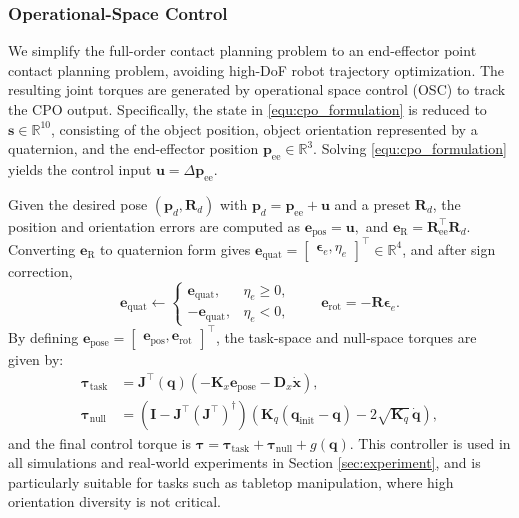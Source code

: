 \subsubsection{Operational-Space Control}
\label{sec:osc_control}
We simplify the full-order contact planning problem to an end-effector point contact planning problem, avoiding high-DoF robot trajectory optimization. The resulting joint torques are generated by operational space control (OSC) \cite{nakanishi2008operational} to track the CPO output. Specifically, the state in \eqref{equ:cpo_formulation} is reduced to $\boldsymbol{s} \in \mathbb{R}^{10}$, consisting of the object position, object orientation represented by a quaternion, and the end-effector position $\boldsymbol{p}_{\text{ee}} \in \mathbb{R}^3$. Solving \eqref{equ:cpo_formulation} yields the control input $\boldsymbol{u} = \Delta \boldsymbol{p}_{\text{ee}}$.

Given the desired pose $(\boldsymbol{p}_d, \boldsymbol{R}_d)$ with $\boldsymbol{p}_d=\boldsymbol{p}_{\text{ee}}+\boldsymbol{u}$ and a preset $\boldsymbol{R}_d$, the position and orientation errors are computed as $\boldsymbol{e}_{\text{pos}} = \boldsymbol{u},
$ and $\boldsymbol{e}_{\text{R}} = \boldsymbol{R}_{\text{ee}}^\top \boldsymbol{R}_d$.
Converting $\boldsymbol{e}_{\text{R}}$ to quaternion form gives $\boldsymbol{e}_{\text{quat}} =
\begin{bmatrix}
\boldsymbol{\epsilon}_e,
\eta_e
\end{bmatrix}^\top
\in \mathbb{R}^4$,
and after sign correction,
\begin{equation}
\boldsymbol{e}_{\text{quat}} \leftarrow
\begin{cases}
\boldsymbol{e}_{\text{quat}}, & \eta_e \ge 0,\\
-\boldsymbol{e}_{\text{quat}}, & \eta_e < 0,
\end{cases}
\qquad
\boldsymbol{e}_{\text{rot}} = -\boldsymbol{R}\boldsymbol{\epsilon}_e.
\end{equation}
By defining
$\boldsymbol{e}_{\text{pose}} =
\begin{bmatrix}
\boldsymbol{e}_{\text{pos}},
\boldsymbol{e}_{\text{rot}}
\end{bmatrix}^\top$,
the task-space and null-space torques are given by:
\begin{align}
\boldsymbol{\tau}_{\text{task}} &=
\boldsymbol{J}^{\top}(\boldsymbol{q})
\left(
-\boldsymbol{K}_x \boldsymbol{e}_{\text{pose}}
-\boldsymbol{D}_x \dot{\boldsymbol{x}}
\right), \\
\boldsymbol{\tau}_{\text{null}} &=
\left(
\boldsymbol{I} - \boldsymbol{J}^{\top}(\boldsymbol{J}^{\top})^{\dagger}
\right)
\left(
\boldsymbol{K}_{q}(\boldsymbol{q}_{\text{init}} - \boldsymbol{q})
- 2\sqrt{\boldsymbol{K}_{q}}\,\dot{\boldsymbol{q}}
\right),
\end{align}
and the final control torque is
$\boldsymbol{\tau} =
\boldsymbol{\tau}_{\text{task}}
+ \boldsymbol{\tau}_{\text{null}}
+ g(\boldsymbol{q})$. This controller is used in all simulations and real-world experiments in Section \ref{sec:experiment}, and is particularly suitable for tasks such as tabletop manipulation, where high orientation diversity is not critical.

